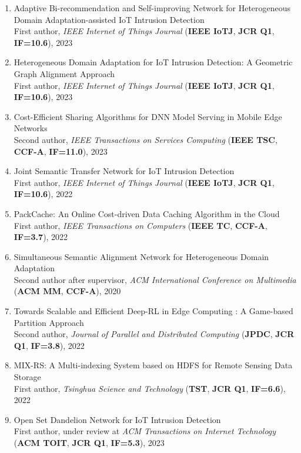 \documentclass[letterpaper,10.9pt]{article}
\begin{document}
\begin{enumerate}
  \item Adaptive Bi-recommendation and Self-improving Network for Heterogeneous Domain Adaptation-assisted IoT Intrusion Detection\\
  First author, \textit{IEEE Internet of Things Journal} (\textbf{IEEE IoTJ}, \textbf{JCR Q1}, \textbf{IF=10.6}), 2023

  \item Heterogeneous Domain Adaptation for IoT Intrusion Detection: A Geometric Graph Alignment Approach\\
  First author, \textit{IEEE Internet of Things Journal} (\textbf{IEEE IoTJ}, \textbf{JCR Q1}, \textbf{IF=10.6}), 2023

  \item Cost-Efficient Sharing Algorithms for DNN Model Serving in Mobile Edge Networks\\
  Second author, \textit{IEEE Transactions on Services Computing} (\textbf{IEEE TSC}, \textbf{CCF-A}, \textbf{IF=11.0}), 2023

  \item Joint Semantic Transfer Network for IoT Intrusion Detection\\
  First author, \textit{IEEE Internet of Things Journal} (\textbf{IEEE IoTJ}, \textbf{JCR Q1}, \textbf{IF=10.6}), 2022

  \item PackCache: An Online Cost-driven Data Caching Algorithm in the Cloud\\
  First author, \textit{IEEE Transactions on Computers} (\textbf{IEEE TC}, \textbf{CCF-A}, \textbf{IF=3.7}), 2022

  \item Simultaneous Semantic Alignment Network for Heterogeneous Domain Adaptation\\
  Second author after supervisor, \textit{ACM International Conference on Multimedia} (\textbf{ACM MM}, \textbf{CCF-A}), 2020

  \item Towards Scalable and Efficient Deep-RL in Edge Computing : A Game-based Partition Approach\\
  Second author, \textit{Journal of Parallel and Distributed Computing} (\textbf{JPDC}, \textbf{JCR Q1}, \textbf{IF=3.8}), 2022

  \item MIX-RS: A Multi-indexing System based on HDFS for Remote Sensing Data Storage\\
  First author, \textit{Tsinghua Science and Technology} (\textbf{TST}, \textbf{JCR Q1}, \textbf{IF=6.6}), 2022

  \item Open Set Dandelion Network for IoT Intrusion Detection\\
  First author, under review at \textit{ACM Transactions on Internet Technology} (\textbf{ACM TOIT}, \textbf{JCR Q1}, \textbf{IF=5.3}), 2023
\end{enumerate}
\end{document}
